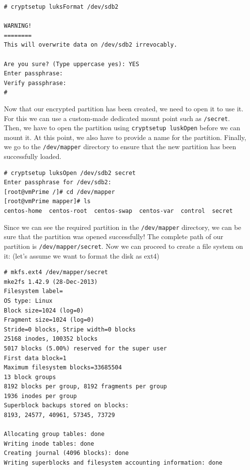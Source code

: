 \vspace{-15pt}
\begin{verbatim}
# cryptsetup luksFormat /dev/sdb2

WARNING!
========
This will overwrite data on /dev/sdb2 irrevocably.

Are you sure? (Type uppercase yes): YES
Enter passphrase: 
Verify passphrase: 
#
\end{verbatim}
\vspace{-10pt}

\noindent
Now that our encrypted partition has been created, we need to open it to use it. For this we can use a custom-made dedicated mount point such as \verb|/secret|. Then, we have to open the partition using \verb|cryptsetup luskOpen| before we can mount it. At this point, we also have to provide a name for the partition. Finally, we go to the \verb|/dev/mapper| directory to ensure that the new partition has been successfully loaded.

\vspace{-15pt}
\begin{verbatim}
# cryptsetup luksOpen /dev/sdb2 secret
Enter passphrase for /dev/sdb2: 
[root@vmPrime /]# cd /dev/mapper
[root@vmPrime mapper]# ls 
centos-home  centos-root  centos-swap  centos-var  control  secret
\end{verbatim}
\vspace{-10pt}

\noindent
Since we can see the required partition in the \verb|/dev/mapper| directory, we can be sure that the partition was opened successfully! The complete path of our partition is \verb|/dev/mapper/secret|. Now we can proceed to create a file system on it: (let's assume we want to format the disk as ext4)

\vspace{-15pt}
\begin{verbatim}
# mkfs.ext4 /dev/mapper/secret
mke2fs 1.42.9 (28-Dec-2013)
Filesystem label=
OS type: Linux
Block size=1024 (log=0)
Fragment size=1024 (log=0)
Stride=0 blocks, Stripe width=0 blocks
25168 inodes, 100352 blocks
5017 blocks (5.00%) reserved for the super user
First data block=1
Maximum filesystem blocks=33685504
13 block groups
8192 blocks per group, 8192 fragments per group
1936 inodes per group
Superblock backups stored on blocks: 
8193, 24577, 40961, 57345, 73729

Allocating group tables: done                            
Writing inode tables: done                            
Creating journal (4096 blocks): done
Writing superblocks and filesystem accounting information: done 
\end{verbatim}
\vspace{-10pt}

